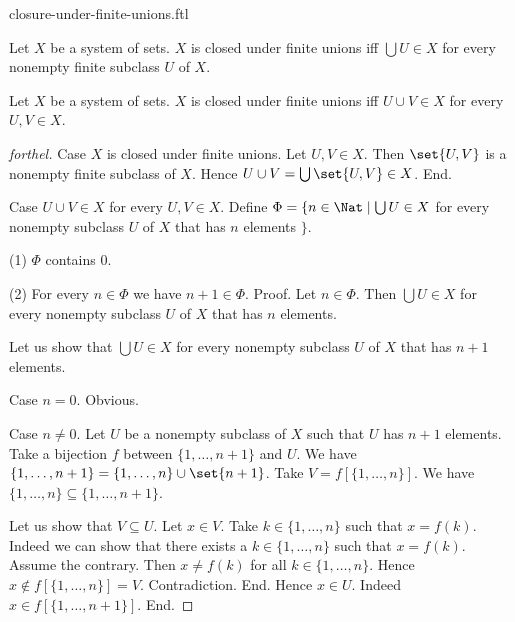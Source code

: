 \documentclass{naproche-library}
\begin{document}
\begin{smodule}[title=Closure Under Finite Unions]{closure-under-finite-unions.ftl}

\begin{definition}[forthel,id=FOUNDATIONS_14_7040118193913856]
  Let $X$ be a system of sets.
  $X$ is closed under finite unions iff $\bigcup U \in X$ for every nonempty finite subclass $U$ of $X$.
\end{definition}

\begin{proposition}[forthel,id=FOUNDATIONS_17_4164024962908160]
  Let $X$ be a system of sets.
  $X$ is closed under finite unions iff $U \cup V \in X$ for every $U, V \in X$.
\end{proposition}
\begin{proof}[forthel]
  Case $X$ is closed under finite unions.
    Let $U, V \in X$.
    Then $\set{U, V}$ is a nonempty finite subclass of $X$.
    Hence $U \cup V = \bigcup \set{U, V} \in X$.
  End.

  Case $U \cup V \in X$ for every $U, V \in X$.
    Define $\Phi = \{ n \in \Nat \mid \bigcup U \in X$ for every nonempty subclass $U$ of $X$ that has $n$ elements $\}$.

    (1) $\Phi$ contains $0$.

    (2) For every $n \in \Phi$ we have $n + 1 \in \Phi$. \newline
    Proof.
      Let $n \in \Phi$.
      Then $\bigcup U \in X$ for every nonempty subclass $U$ of $X$ that has $n$ elements.

      Let us show that $\bigcup U \in X$ for every nonempty subclass $U$ of $X$ that has $n + 1$ elements.

        Case $n = 0$. Obvious.

        Case $n \neq 0$.
          Let $U$ be a nonempty subclass of $X$ such that $U$ has $n + 1$ elements.
          Take a bijection $f$ between $\{1, \dots, n + 1 \}$ and $U$.
          We have $\{ 1, \dots, n + 1 \} = \{ 1, \dots, n \} \cup \set{n + 1}$.
          Take $V = f[\{ 1, \dots, n \}]$.
          We have $\{ 1, \dots, n \} \subseteq \{ 1, \dots, n + 1 \}$.

          Let us show that $V \subseteq U$.
            Let $x \in V$.
            Take $k \in \{ 1, \dots, n \}$ such that $x = f(k)$.
            Indeed we can show that there exists a $k \in \{ 1, \dots, n \}$ such that $x = f(k)$.
              Assume the contrary.
              Then $x \neq f(k)$ for all $k \in \{ 1, \dots, n \}$.
              Hence $x \notin f[\{ 1, \dots, n \}] = V$.
              Contradiction.
            End.
            Hence $x \in U$.
            Indeed $x \in f[\{ 1, \dots, n + 1 \}]$.
          End.


\end{proof}
\end{smodule}
\end{document}

